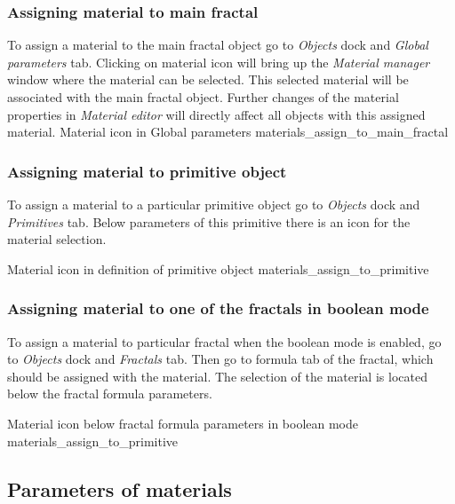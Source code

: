 \subsubsection{Assigning material to main fractal}\label{assigning-material-to-main-fractal}

To assign a material to the main fractal object go to \emph{Objects} dock and \emph{Global parameters} tab. Clicking on material icon will bring up the \emph{Material manager} window where the material can be selected. This selected material will be associated with the main fractal object. Further changes of the material properties in \emph{Material editor} will directly affect all objects with this assigned material.
\nopagebreak
{}
{Material icon in Global parameters}
{materials_assign_to_main_fractal}

\subsubsection{Assigning material to primitive object}\label{assigning-material-to-primitive}

To assign a material to a particular primitive object go to \emph{Objects} dock and \emph{Primitives} tab. Below parameters of this primitive there is an icon for the material selection.
 
\nopagebreak
{}
{Material icon in definition of primitive object}
{materials_assign_to_primitive}

\subsubsection{Assigning material to one of the fractals in boolean mode}\label{assigning-material-to-boolean}

To assign a material to particular fractal when the boolean mode is enabled, go to \emph{Objects} dock and \emph{Fractals} tab. Then go to formula tab of the fractal, which should be assigned with the material. The selection of the material is located below the fractal formula parameters.

\nopagebreak
{}
{Material icon below fractal formula parameters in boolean mode}
{materials_assign_to_primitive}

\subsection{Parameters of materials}\label{materials-parameters}

